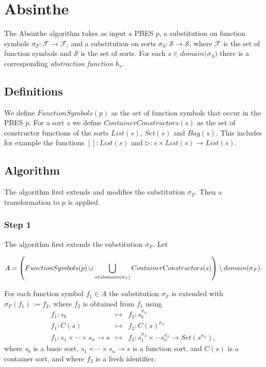 \documentclass{article}
\begin{document}
\newpage

\section{Absinthe}

The Absinthe algorithm takes as input a PBES $p$, a substitution on function
symbols $\sigma _{F}:\mathcal{F}\rightarrow \mathcal{F}$, and a substitution
on sorts $\sigma _{S}:\mathcal{S}\rightarrow \mathcal{S}$, where $\mathcal{F}
$ is the set of function symbols and $\mathcal{S}$ is the set of sorts. For
each $s\in domain(\sigma _{S}\mathcal{)}$ there is a corresponding \emph{%
abstraction function} $h_{s}$.

\subsection{Definitions}

We define $FunctionSymbols(p)$ as the set of function symbols that occur in
the PBES $p$. For a sort $s$ we define $ContainerConstructors(s)$ as the set
of constructor functions of the sorts $List(s)$, $Set(s)$ and $Bag(s)$. This
includes for example the functions $[]:List(s)$ and $\rhd :s\times
List(s)\rightarrow List(s)$.

\subsection{Algorithm}

The algorithm first extends and modifies the substitution $\sigma _{F}$.
Then a transformation to $p$ is applied.

\subsubsection{Step 1}

The algorithm first extends the substitution $\sigma _{F}$. Let

\begin{equation*}
A=\left( FunctionSymbols(p)\cup \dbigcup\limits_{s\in domain(\sigma
_{S})}ContainerConstructors(s)\right) \setminus domain(\sigma _{F}\mathcal{)}%
.
\end{equation*}

For each function symbol $f_{1}\in A$ the substitution $\sigma _{F}$ is
extended with $\sigma _{F}(f_{1}):=f_{2}$, where $f_{2}$ is obtained from $%
f_{1}$ using%
\begin{equation*}
\begin{array}{lcl}
f_{1}:s_{b} & \mapsto & f_{2}:s_{b}^{\sigma _{S}} \\ 
f_{1}:C(s) & \mapsto & f_{2}:C(s)^{\sigma _{S}} \\ 
f_{1}:s_{1}\times \cdots \times s_{n}\rightarrow s & \mapsto & 
f_{2}:s_{1}^{\sigma _{S}}\times \cdots s_{n}^{\sigma _{S}}\rightarrow
Set(s^{\sigma _{S}}),%
\end{array}%
\end{equation*}%
where $s_{b}$ is a basic sort, $s_{1}\times \cdots \times s_{n}\rightarrow s$
is a function sort, and $C(s)$ is a container sort, and where $f_{2}$ is a
fresh identifier.
\end{document}
